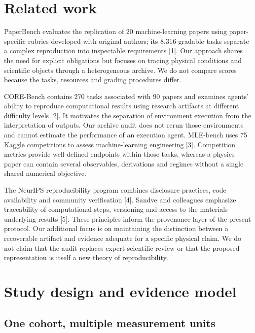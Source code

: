 \documentclass[10pt,a4paper]{article}
\begin{document}
\section{Related work}\label{related-work}

PaperBench evaluates the replication of 20 machine-learning papers using
paper-specific rubrics developed with original authors; its 8,316
gradable tasks separate a complex reproduction into inspectable
requirements {[}1{]}. Our approach shares the need for explicit
obligations but focuses on tracing physical conditions and scientific
objects through a heterogeneous archive. We do not compare scores
because the tasks, resources and grading procedures differ.

CORE-Bench contains 270 tasks associated with 90 papers and examines
agents' ability to reproduce computational results using research
artifacts at different difficulty levels {[}2{]}. It motivates the
separation of environment execution from the interpretation of outputs.
Our archive audit does not rerun those environments and cannot estimate
the performance of an execution agent. MLE-bench uses 75 Kaggle
competitions to assess machine-learning engineering {[}3{]}. Competition
metrics provide well-defined endpoints within those tasks, whereas a
physics paper can contain several observables, derivations and regimes
without a single shared numerical objective.

The NeurIPS reproducibility program combines disclosure practices, code
availability and community verification {[}4{]}. Sandve and colleagues
emphasize traceability of computational steps, versioning and access to
the materials underlying results {[}5{]}. These principles inform the
provenance layer of the present protocol. Our additional focus is on
maintaining the distinction between a recoverable artifact and evidence
adequate for a specific physical claim. We do not claim that the audit
replaces expert scientific review or that the proposed representation is
itself a new theory of reproducibility.

\section{Study design and evidence
model}\label{study-design-and-evidence-model}

\subsection{One cohort, multiple measurement
units}\label{one-cohort-multiple-measurement-units}
\end{document}
